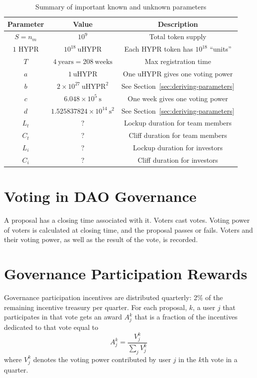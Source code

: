 \documentclass{article}
\begin{document}
\begin{table}[htbp]
    \centering
    \caption{Summary of important known and unknown parameters}
    \label{tab:student-performance}
    \begin{tabular}{|c|c|c|}
    \hline
    \textbf{Parameter} & \textbf{Value} & \textbf{Description} \\
    \hline
    $S = n_m$ & $10^9$ & Total token supply \\
    $1$ HYPR & $10^{18}~\text{uHYPR}$ & Each HYPR token has $10^{18}$ ``units'' \\
    $T$ & $4~\text{years} = 208~\text{weeks}$ & Max registration time \\
    $a$ & $1~\text{uHYPR}$ & One uHYPR gives one voting power \\
    $b$ & $2 \times 10^{27}~\text{uHYPR}^2$ & See Section~\ref{sec:deriving-parameters} \\
    $c$ & $6.048 \times 10^5~\text{s}$ & One week gives one voting power \\
    $d$ & $1.525837824 \times 10^{14}~\text{s}^2$ & See Section~\ref{sec:deriving-parameters} \\
    $L_t$ & ? & Lockup duration for team members \\
    $C_t$ & ? & Cliff duration for team members \\
    $L_i$ & ? & Lockup duration for investors \\
    $C_i$ & ? & Cliff duration for investors \\
    \hline
	\end{tabular}
\end{table}

\section{Voting in DAO Governance}\label{sec:voting}

A proposal has a closing time associated with it.
Voters cast votes.
Voting power of voters is calculated at closing time, and the proposal passes or fails.
Voters and their voting power, as well as the result of the vote, is recorded.

\section{Governance Participation Rewards}\label{sec:rewards}

Governance participation incentives are distributed quarterly: 2\% of the remaining incentive treasury per quarter.
For each proposal, $k$, a user $j$ that participates in that vote gets an award $A^{k}_j$ that is a fraction of the incentives dedicated to that vote equal to
\begin{equation}
A^{k}_j = \frac{V^{k}_j}{\sum_j V^{k}_j}
\end{equation}
where $V^{k}_j$ denotes the voting power contributed by user $j$ in the $k$th vote in a quarter.
\end{document}
